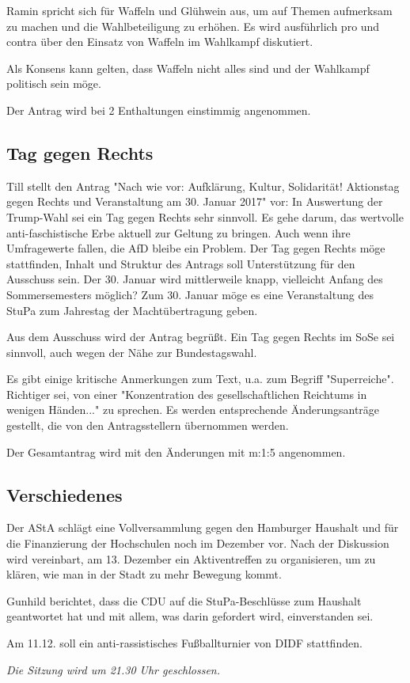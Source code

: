 \documentclass[ngerman,headheight=70pt]{scrartcl}
\begin{document}
    Ramin spricht sich für Waffeln und Glühwein aus, um auf Themen aufmerksam zu
    machen und die  Wahlbeteiligung zu erhöhen. Es wird ausführlich pro und
    contra über den Einsatz von Waffeln im Wahlkampf diskutiert.

    Als Konsens kann gelten, dass Waffeln nicht alles sind und der Wahlkampf
    politisch sein möge.

    Der Antrag wird bei 2 Enthaltungen einstimmig angenommen.

    \subsection{Tag gegen Rechts}

    Till stellt den Antrag "Nach wie vor: Aufklärung, Kultur, Solidarität!
    Aktionstag gegen Rechts und Veranstaltung am 30. Januar 2017" vor: In
    Auswertung der Trump-Wahl sei ein Tag gegen Rechts sehr sinnvoll. Es gehe
    darum, das wertvolle anti-faschistische Erbe aktuell zur Geltung zu bringen.
    Auch wenn ihre Umfragewerte fallen, die AfD bleibe ein Problem. Der Tag gegen
    Rechts möge stattfinden, Inhalt und Struktur des Antrags soll Unterstützung
    für den Ausschuss sein.
    Der 30. Januar wird mittlerweile knapp, vielleicht Anfang des Sommersemesters
    möglich? Zum 30. Januar möge es eine Veranstaltung des StuPa zum Jahrestag
    der Machtübertragung geben.

    Aus dem Ausschuss wird der Antrag begrüßt. Ein Tag gegen Rechts im SoSe
    sei sinnvoll, auch  wegen der Nähe zur Bundestagswahl.

    Es gibt einige kritische Anmerkungen zum Text, u.a. zum Begriff
    "Superreiche". Richtiger sei, von einer "Konzentration des gesellschaftlichen
    Reichtums in wenigen Händen..." zu sprechen. Es werden entsprechende
    Änderungsanträge gestellt, die von den Antragsstellern übernommen werden.

    Der Gesamtantrag wird mit den Änderungen mit m:1:5 angenommen.

    \subsection{Verschiedenes}

    Der AStA schlägt eine Vollversammlung gegen den Hamburger Haushalt und für
    die Finanzierung der Hochschulen noch im Dezember vor. Nach der Diskussion
    wird vereinbart, am 13. Dezember ein Aktiventreffen zu organisieren, um zu
    klären, wie man in der Stadt zu mehr Bewegung kommt.

    Gunhild berichtet, dass die CDU auf die StuPa-Beschlüsse zum Haushalt
    geantwortet hat und mit allem, was darin gefordert wird, einverstanden sei.

    Am 11.12. soll ein anti-rassistisches Fußballturnier von DIDF stattfinden.

    \textit{Die Sitzung wird um 21.30 Uhr geschlossen.}
\end{document}
